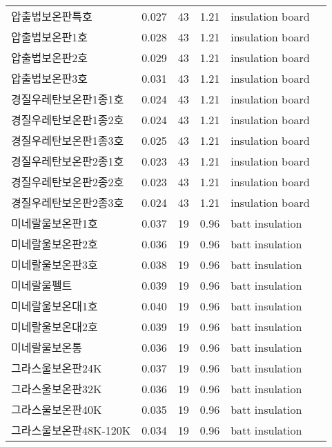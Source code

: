 \begin{longtable}{llcclc}
  압출법보온판특호 &   0.027 &   43 & 1.21 & insulation board & \cite{ashrae_f18} \\
  압출법보온판1호 &   0.028 &   43 & 1.21 & insulation board & \cite{ashrae_f18} \\
  압출법보온판2호 &   0.029 &   43 & 1.21 & insulation board & \cite{ashrae_f18} \\
  압출법보온판3호 &   0.031 &   43 & 1.21 & insulation board & \cite{ashrae_f18} \\
  경질우레탄보온판1종1호 &   0.024 &   43 & 1.21 & insulation board & \cite{ashrae_f18} \\
  경질우레탄보온판1종2호 &   0.024 &   43 & 1.21 & insulation board & \cite{ashrae_f18} \\
  경질우레탄보온판1종3호 &   0.025 &   43 & 1.21 & insulation board & \cite{ashrae_f18} \\
  경질우레탄보온판2종1호 &   0.023 &   43 & 1.21 & insulation board & \cite{ashrae_f18} \\
  경질우레탄보온판2종2호 &   0.023 &   43 & 1.21 & insulation board & \cite{ashrae_f18} \\
  경질우레탄보온판2종3호 &   0.024 &   43 & 1.21 & insulation board & \cite{ashrae_f18} \\
  미네랄울보온판1호 &   0.037 &   19 & 0.96 & batt insulation & \cite{ashrae_f18} \\
  미네랄울보온판2호 &   0.036 &   19 & 0.96 & batt insulation & \cite{ashrae_f18} \\
  미네랄울보온판3호 &   0.038 &   19 & 0.96 & batt insulation & \cite{ashrae_f18} \\
  미네랄울펠트 &   0.039 &   19 & 0.96 & batt insulation & \cite{ashrae_f18} \\
  미네랄울보온대1호 &   0.040 &   19 & 0.96 & batt insulation & \cite{ashrae_f18} \\
  미네랄울보온대2호 &   0.039 &   19 & 0.96 & batt insulation & \cite{ashrae_f18} \\
  미네랄울보온통 &   0.036 &   19 & 0.96 & batt insulation & \cite{ashrae_f18} \\
  그라스울보온판24K &   0.037 &   19 & 0.96 & batt insulation & \cite{ashrae_f18} \\
  그라스울보온판32K &   0.036 &   19 & 0.96 & batt insulation & \cite{ashrae_f18} \\
  그라스울보온판40K &   0.035 &   19 & 0.96 & batt insulation & \cite{ashrae_f18} \\
  그라스울보온판48K-120K &   0.034 &   19 & 0.96 & batt insulation & \cite{ashrae_f18} \\

\end{longtable}
